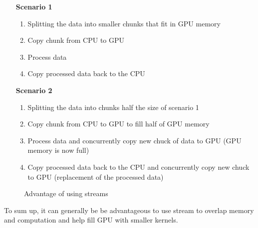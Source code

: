 \begin{enumerate}
	\item[\textbf{Scenario 1}]
		\begin{enumerate}
			\item Splitting the data into smaller chunks that fit in GPU memory
			\item Copy chunk from CPU to GPU
			\item Process data
			\item Copy processed data back to the CPU
		\end{enumerate}
	\item[\textbf{Scenario 2}]
			\begin{enumerate}
				\item Splitting the data into chunks half the size of scenario 1
				\item Copy chunk from CPU to GPU to fill half of GPU memory
				\item Process data and concurrently copy new chuck of data to GPU (GPU memory is now full)
				\item Copy processed data back to the CPU and concurrently copy new chuck to GPU (replacement of the processed data)
		\end{enumerate}
\end{enumerate}
\begin{figure}[ht]
	\centering
	\caption{Advantage of using streams}
	\label{fig:streams-advantage}
\end{figure}
To sum up, it can generally be be advantageous to use stream to overlap memory and computation and help fill GPU with smaller kernels.
